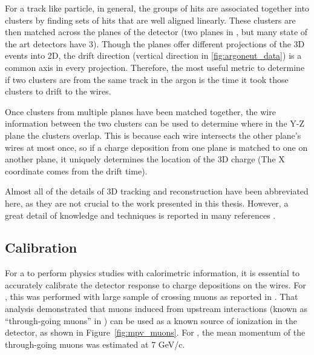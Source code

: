 For a track like particle, in general, the groups of hits are associated together into clusters by finding sets of hits that are well aligned linearly.  These clusters are then matched across the planes of the detector (two planes in \argoneut, but many state of the art detectors have 3).  Though the planes offer different projections of the 3D events into 2D, the drift direction (vertical direction in \ref{fig:argoneut_data}) is a common axis in every projection.  Therefore, the most useful metric to determine if two clusters are from the same track in the argon is the time it took those clusters to drift to the wires.

Once clusters from multiple planes have been matched together, the wire information between the two clusters can be used to determine where in the Y-Z plane the clusters overlap.  This is because each wire intersects the other plane's wires at most once, so if a charge deposition from one plane is matched to one on another plane, it uniquely determines the location of the 3D charge (The X coordinate comes from the drift time).

Almost all of the details of 3D tracking and reconstruction have been abbreviated here, as they are not crucial to the work presented in this thesis.  However, a great detail of knowledge and techniques is reported in many references \cite{Antonello:2012hu,uboone_pub_1015}.

%
%

\subsection{\label{subsec:lartpc_calibration} Calibration}

For a \lartpc to perform physics studies with calorimetric information, it is essential to accurately calibrate the detector response to charge depositions on the wires.  For \argoneut, this was performed with large sample of crossing muons as reported in \cite{Anderson:2012mra}.  That analysis demonstrated that muons induced from upstream interactions (known as ``through-going muons'' in \argoneut) can be used as a known source of ionization in the detector, as shown in Figure~\ref{fig:mpv_muons}.  For \argoneut, the mean momentum of the through-going muons was estimated at 7 GeV/c.


